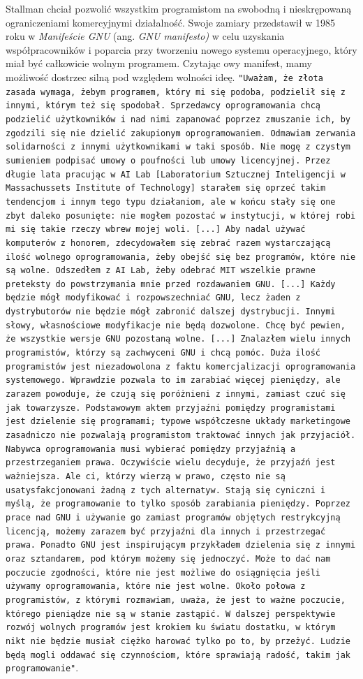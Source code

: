 \documentclass{article}
\begin{document}
Stallman chciał pozwolić wszystkim programistom na swobodną i nieskrępowaną ograniczeniami komercyjnymi działalność. Swoje zamiary przedstawił w 1985 roku w \emph{Manifeście GNU} (ang. \emph{GNU manifesto)} w celu uzyskania współpracowników i poparcia przy tworzeniu nowego systemu operacyjnego, który miał być całkowicie wolnym programem\cite{Kotula}. Czytając owy manifest, mamy możliwość dostrzec silną pod względem wolności ideę. \texttt{"Uważam, że złota zasada wymaga, żebym programem, który mi się podoba, podzielił się z innymi, którym też się spodobał. Sprzedawcy oprogramowania chcą podzielić \newline użytkowników i nad nimi zapanować poprzez zmuszanie ich, by zgodzili się nie dzielić zakupionym oprogramowaniem. Odmawiam zerwania solidarności z innymi użytkownikami w taki sposób. Nie mogę z czystym sumieniem podpisać umowy o poufności lub umowy licencyjnej. Przez długie lata pracując w AI Lab [Laboratorium Sztucznej Inteligencji w Massachussets Institute of Technology] starałem się oprzeć takim tendencjom i innym tego typu działaniom, ale w końcu stały się one zbyt daleko posunięte: nie mogłem pozostać w instytucji, w której robi mi się takie rzeczy wbrew mojej woli. [...] Aby nadal używać komputerów z honorem, zdecydowałem się zebrać razem wystarczającą ilość wolnego oprogramowania, żeby obejść się bez programów, które nie są wolne. Odszedłem z AI Lab, żeby odebrać MIT wszelkie prawne preteksty do powstrzymania mnie przed rozdawaniem GNU. [...] Każdy będzie mógł modyfikować i rozpowszechniać GNU, lecz żaden z dystrybutorów nie będzie mógł zabronić dalszej dystrybucji. Innymi słowy, własnościowe modyfikacje nie będą dozwolone. Chcę być pewien, że wszystkie wersje GNU pozostaną wolne. [...] Znalazłem wielu innych programistów, którzy są zachwyceni GNU i chcą pomóc. Duża ilość programistów jest niezadowolona z faktu komercjalizacji oprogramowania systemowego. Wprawdzie pozwala to im zarabiać więcej pieniędzy, ale zarazem powoduje, że czują się poróżnieni z innymi, zamiast czuć się jak towarzysze. Podstawowym aktem przyjaźni pomiędzy programistami jest dzielenie się programami; typowe współczesne układy marketingowe zasadniczo nie pozwalają programistom traktować innych jak przyjaciół. Nabywca oprogramowania musi wybierać pomiędzy przyjaźnią a przestrzeganiem prawa. Oczywiście wielu decyduje, że przyjaźń jest ważniejsza. Ale ci, którzy wierzą w prawo, często nie są usatysfakcjonowani żadną z tych alternatyw. Stają się cyniczni i myślą, że programowanie to tylko sposób zarabiania pieniędzy. Poprzez prace nad GNU i używanie go zamiast programów objętych restrykcyjną licencją, możemy zarazem być przyjaźni dla innych i przestrzegać prawa. Ponadto GNU jest inspirującym przykładem dzielenia się z innymi oraz sztandarem, pod którym możemy się jednoczyć. Może to dać nam poczucie zgodności, które nie jest możliwe do osiągnięcia jeśli używamy oprogramowania, które nie jest wolne. Około połowa z programistów, z którymi rozmawiam, uważa, że jest to ważne poczucie, którego pieniądze nie są w stanie zastąpić. W dalszej perspektywie rozwój wolnych programów jest krokiem ku światu dostatku, w którym nikt nie będzie musiał ciężko harować tylko po to, by przeżyć. Ludzie będą mogli oddawać się czynnościom, które sprawiają radość, takim jak programowanie"}\cite{gnu.manifest}. 
\end{document}
